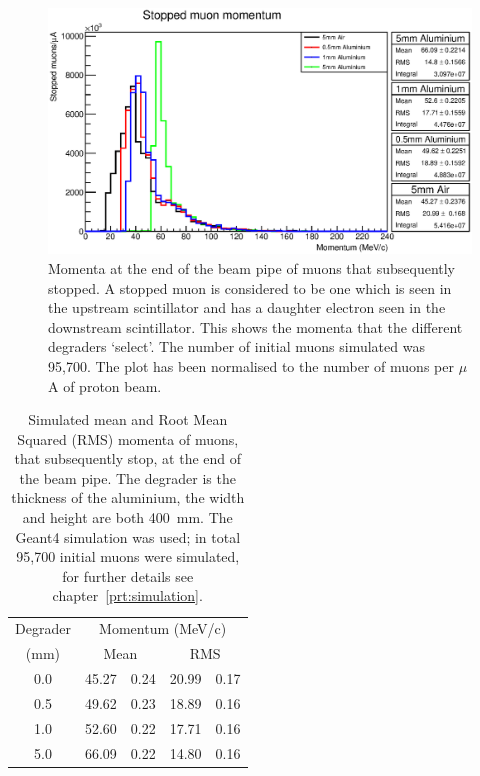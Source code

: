 \begin{figure}[hptb]
  \centering
    \includegraphics[width=.8\textwidth]{images/momentum_spectrum/stopped_muon_momentum.eps}
  \caption{Momenta at the end of the beam pipe of muons that subsequently stopped. A stopped muon is considered to be one which is seen in the upstream scintillator and has a daughter electron seen in the downstream scintillator. This shows the momenta that the different degraders `select'. The number of initial muons simulated was 95,700. The plot has been normalised to the number of muons per \(\mu\)A of proton beam.}
  \label{fig:images_momentum_spectrum_stopped_muon_momentum}
\end{figure}

\begin{table}
  \lineup
  \begin{center}
  \begin{tabular}{c | r@{\(\pm\)}l | r@{\(\pm\)}l }
    Degrader  &  \multicolumn{4}{c}{Momentum (MeV/c)}      \\
      (mm)    &  \multicolumn{2}{c|}{Mean}  
                               &  \multicolumn{2}{c}{RMS}  \\
    \hline
      0.0     &  45.27 & 0.24  &  20.99 & 0.17             \\
      0.5     &  49.62 & 0.23  &  18.89 & 0.16             \\
      1.0     &  52.60 & 0.22  &  17.71 & 0.16             \\
      5.0     &  66.09 & 0.22  &  14.80 & 0.16             \\
  \end{tabular}
  \end{center}
  \caption{Simulated mean and Root Mean Squared (RMS) momenta of muons, that subsequently stop, at the end of the beam pipe. The degrader is the thickness of the aluminium, the width and height are both 400~mm. The Geant4 simulation was used; in total 95,700 initial muons were simulated, for further details see chapter~\ref{prt:simulation}.}
  \label{tab:stopped_muon_mom}
\end{table}

